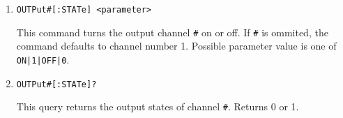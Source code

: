 \documentclass[a4paper,10pt]{article}
\begin{document}
\begin{enumerate}
\begin{enumerate}
		\item 
		    \begin{verbatim}OUTPut#[:STATe] <parameter>\end{verbatim}
		    \begin{description}
		        This command turns the output channel \verb!#! on or off. If \verb|#| is ommited, the command defaults to channel number 1.
		        \newline Possible parameter value is one of \verb!ON|1|OFF|0!.
		    \end{description}
		\item 
		    \begin{verbatim}OUTPut#[:STATe]?\end{verbatim}
		    \begin{description}
		        This query returns the output states of channel \verb!#!. Returns 0 or 1.
		    \end{description}

    
    \end{enumerate}
\end{enumerate}
\end{document}

